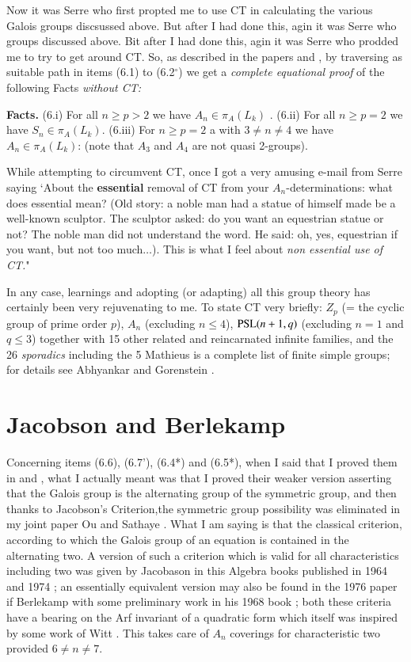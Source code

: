 Now it was Serre who first propted me to use CT in calculating the various Galois groups discsussed above. But after I had done this, agin it was Serre who groups discussed above. Bit after I had done this, agin it was Serre who prodded me to try to get around CT. So, as described in the papers \cite{art1-key8} and \cite{art1-key10}, by traversing as suitable path in items (6.1) to (6.2$^{\circ}$) we get a \textit{complete equational proof} of the following Facts \textit{without CT:}

\medskip
\noindent
\textbf{Facts.} (6.i) For all $n \geq p > 2$ we have $A_{n}\in \pi_{A}(L_{k})$ . (6.ii) For all $n\geq p = 2$ we have $S_{n} \in \pi_{A}(L_{k})$. (6.iii) For $n \geq p =2$ a with $3\neq n \neq 4$ we have $A_{n}\in\pi_{A}(L_{k})$: (note that $A_{3}$ and $A_{4}$ are not quasi 2-groups).

While attempting to circumvent CT, once I got a very amusing e-mail from Serre saying `About the \textbf{essential} removal of CT from your $A_{n}$-determinations: what does essential mean? (Old story: a noble man had a statue of himself made be a well-known sculptor. The sculptor asked: do you want an equestrian statue or not? The noble man did not understand the word. He said: oh, yes, equestrian if you want, but not too much$\ldots$). This is what I feel about \textit{non essential use of CT.}"

 In any case, learnings and adopting (or adapting) all this group theory has certainly been very rejuvenating to me. To state CT very briefly: $Z_{p}$ (= the cyclic group of prime order $p$), $A_{n}$ (excluding $n\leq 4$), $\operatorname{PSL}(n+1, q)$
(excluding $n=1$ and $q \leq 3$) together with 15 other related and reincarnated infinite families, and the 26 \textit{sporadics} including the 5 Mathieus is a complete list of finite simple groups; for details see Abhyankar \cite{art1-key8} and Gorenstein \cite{art1-key32}.

\section{Jacobson and Berlekamp}

Concerning items (6.6), (6.7'), (6.4*) and (6.5*), when I said that I proved them in \cite{art1-key8} and \cite{art1-key10}, what I actually meant was that I proved their weaker version asserting that the Galois group is the alternating group of the symmetric group, and then thanks to Jacobson's Criterion,the symmetric group possibility was eliminated in my joint paper Ou and Sathaye \cite{art-key14}. What I am saying is that the classical criterion, according to which the Galois group of an equation is contained in the alternating two. A version of such a criterion which is valid for all characteristics including two was given by Jacobason in this Algebra books published in 1964 \cite{art1-key37} and 1974 \cite{art1-key38}; an essentially equivalent version may also be found in the 1976 paper \cite{art1-key20} if Berlekamp with some preliminary work in his 1968 book \cite{art1-key19}; both these criteria have a bearing on the Arf invariant of a quadratic form \cite{art1-key18} which itself was inspired by some work of Witt \cite{art1-key61}. This takes care of $A_{n}$ coverings for characteristic two provided $ 6 \neq n \neq 7$. 

